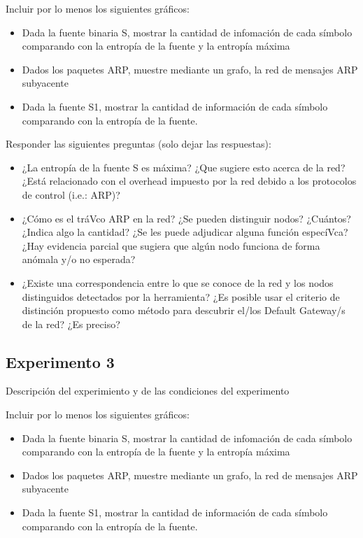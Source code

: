 Incluir por lo menos los siguientes gr\'aficos:

\begin{itemize}
	\item Dada la fuente binaria S, mostrar la cantidad de infomación de cada símbolo comparando con la entropía de la fuente y la entropía máxima
	\item Dados los paquetes ARP, muestre mediante un grafo, la red de mensajes ARP subyacente
	\item Dada la fuente S1, mostrar la cantidad de información de cada símbolo comparando con la entropía de la fuente.
\end{itemize}

Responder las siguientes preguntas (solo dejar las respuestas):

\begin{itemize}
	\item ¿La entropía de la fuente S es máxima? ¿Que sugiere esto acerca de la red? ¿Está relacionado con el overhead impuesto por la red debido a los protocolos de control (i.e.: ARP)?
	\item ¿Cómo es el tráVco ARP en la red? ¿Se pueden distinguir nodos? ¿Cuántos? ¿Indica algo la cantidad? ¿Se les puede adjudicar alguna función especíVca? ¿Hay evidencia parcial que sugiera que algún nodo funciona de forma anómala y/o no esperada?
	\item ¿Existe una correspondencia entre lo que se conoce de la red y los nodos distinguidos detectados por la herramienta? ¿Es posible usar el criterio de distinción propuesto como método para descubrir el/los Default Gateway/s de la red? ¿Es preciso?
\end{itemize}


\subsection{Experimento 3}

Descripci\'on del experimiento y de las condiciones del experimento

Incluir por lo menos los siguientes gr\'aficos:

\begin{itemize}
	\item Dada la fuente binaria S, mostrar la cantidad de infomación de cada símbolo comparando con la entropía de la fuente y la entropía máxima
	\item Dados los paquetes ARP, muestre mediante un grafo, la red de mensajes ARP subyacente
	\item Dada la fuente S1, mostrar la cantidad de información de cada símbolo comparando con la entropía de la fuente.
\end{itemize}

